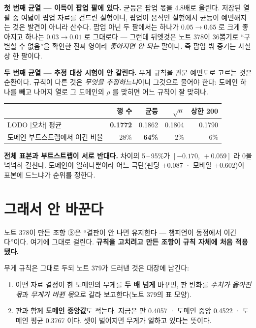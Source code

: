 \documentclass[11pt]{article}
\begin{document}
\textbf{첫 번째 균열 --- 이득이 팝업 팔에 있다.} 균등은 팝업 몫을 4.8배로
올린다. 저장된 열 팔 중 여덟이 팝업 자료를 건드린 실험이니, 팝업이 움직인
실험에서 균등이 예민해지는 것은 발견이 아니라 산수다. 팝업 아닌 두 팔에서는
하나가 $0.05 \to 0.65$ 로 크게 좋아지고 하나는 $0.03 \to 0.01$ 로 그대로다
--- 그런데 뒤엣것은 노트 378이 36뽑기로 ``구별할 수 없음''을 확인한
진짜 영이라 \emph{좋아지면 안 되는} 팔이다. 즉 팝업 밖 증거는 사실상
한 팔이다.

\textbf{두 번째 균열 --- 추정 대상 시험이 안 갈린다.} 무게 규칙을 관문
예민도로 고르는 것은 순환이다. 규칙이 다른 것은 \emph{무엇을 추정하느냐}이니
그것으로 물어야 한다: 도메인 하나를 빼고 나머지 열로 그 도메인의 $\rho$ 를
맞히면 어느 규칙이 잘 맞히나.

\begin{center}
\begin{tabular}{lrrrr}
\hline
 & 행 수 & 균등 & $\sqrt{n}$ & 상한 200 \\
\hline
LODO $|$오차$|$ 평균 & \textbf{0.1772} & 0.1862 & 0.1804 & 0.1790 \\
도메인 부트스트랩에서 이긴 비율 & 28\% & \textbf{64\%} & 2\% & 6\% \\
\hline
\end{tabular}
\end{center}

\textbf{전체 표본과 부트스트랩이 서로 반대다.} 차이의 5\,--\,95\%가
$[-0.170,\ +0.059]$ 라 0을 넉넉히 걸친다. 도메인이 열하나뿐이라 어느
극단(펀딩 $+0.087$ · 모바일 $+0.602$)이 표본에 드느냐가 순위를 정한다.

\section{그래서 안 바꾼다}

노트 378이 만든 조항 ③은 ``결판이 안 나면 유지한다 --- 챔피언이 동점에서
이긴다''이다. 여기에 그대로 걸린다. \textbf{규칙을 고치려고 만든 조항이
규칙 자체에 처음 적용됐다.}

무게 규칙은 그대로 두되 노트 379가 드러낸 것은 대장에 남긴다:

\begin{enumerate}
\item 어떤 자료 결정이 한 도메인의 무게를 \textbf{두 배 넘게} 바꾸면,
판 변화를 \emph{수치가 옳아진 몫}과 \emph{무게가 바뀐 몫}으로 갈라
보고한다(노트 379의 표 모양).
\item 판과 함께 \textbf{도메인 중앙값}도 적는다. 지금은 판 0.4057 · 도메인
중앙 0.4522 · 도메인 평균 0.3767 이다. 셋이 벌어지면 무게가 일하고 있다는
뜻이다.
\end{enumerate}
\end{document}

